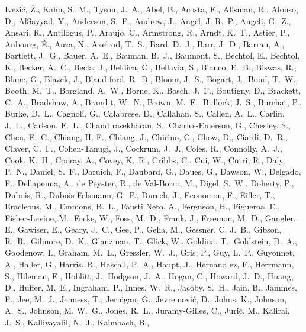 \documentclass[]{spie}
\begin{document}
\begin{thebibliography}{10}
  {Ivezi{\'c}}, {\v{Z}}., {Kahn}, S.~M., {Tyson}, J.~A., {Abel}, B., {Acosta},
    E., {Allsman}, R., {Alonso}, D., {AlSayyad}, Y., {Anderson}, S.~F., {Andrew},
    J., {Angel}, J. R.~P., {Angeli}, G.~Z., {Ansari}, R., {Antilogus}, P.,
    {Araujo}, C., {Armstrong}, R., {Arndt}, K.~T., {Astier}, P., {Aubourg},
    {\'E}., {Auza}, N., {Axelrod}, T.~S., {Bard}, D.~J., {Barr}, J.~D., {Barrau},
    A., {Bartlett}, J.~G., {Bauer}, A.~E., {Bauman}, B.~J., {Baumont}, S.,
    {Bechtol}, E., {Bechtol}, K., {Becker}, A.~C., {Becla}, J., {Beldica}, C.,
    {Bellavia}, S., {Bianco}, F.~B., {Biswas}, R., {Blanc}, G., {Blazek}, J.,
    {Bland ford}, R.~D., {Bloom}, J.~S., {Bogart}, J., {Bond}, T.~W., {Booth},
    M.~T., {Borgland}, A.~W., {Borne}, K., {Bosch}, J.~F., {Boutigny}, D.,
    {Brackett}, C.~A., {Bradshaw}, A., {Brand t}, W.~N., {Brown}, M.~E.,
    {Bullock}, J.~S., {Burchat}, P., {Burke}, D.~L., {Cagnoli}, G., {Calabrese},
    D., {Callahan}, S., {Callen}, A.~L., {Carlin}, J.~L., {Carlson}, E.~L.,
    {Chand rasekharan}, S., {Charles-Emerson}, G., {Chesley}, S., {Cheu}, E.~C.,
    {Chiang}, H.-F., {Chiang}, J., {Chirino}, C., {Chow}, D., {Ciardi}, D.~R.,
    {Claver}, C.~F., {Cohen-Tanugi}, J., {Cockrum}, J.~J., {Coles}, R.,
    {Connolly}, A.~J., {Cook}, K.~H., {Cooray}, A., {Covey}, K.~R., {Cribbs}, C.,
    {Cui}, W., {Cutri}, R., {Daly}, P.~N., {Daniel}, S.~F., {Daruich}, F.,
    {Daubard}, G., {Daues}, G., {Dawson}, W., {Delgado}, F., {Dellapenna}, A.,
    {de Peyster}, R., {de Val-Borro}, M., {Digel}, S.~W., {Doherty}, P.,
    {Dubois}, R., {Dubois-Felsmann}, G.~P., {Durech}, J., {Economou}, F.,
    {Eifler}, T., {Eracleous}, M., {Emmons}, B.~L., {Fausti Neto}, A.,
    {Ferguson}, H., {Figueroa}, E., {Fisher-Levine}, M., {Focke}, W., {Foss},
    M.~D., {Frank}, J., {Freemon}, M.~D., {Gangler}, E., {Gawiser}, E., {Geary},
    J.~C., {Gee}, P., {Geha}, M., {Gessner}, C. J.~B., {Gibson}, R.~R.,
    {Gilmore}, D.~K., {Glanzman}, T., {Glick}, W., {Goldina}, T., {Goldstein},
    D.~A., {Goodenow}, I., {Graham}, M.~L., {Gressler}, W.~J., {Gris}, P., {Guy},
    L.~P., {Guyonnet}, A., {Haller}, G., {Harris}, R., {Hascall}, P.~A., {Haupt},
    J., {Hernand ez}, F., {Herrmann}, S., {Hileman}, E., {Hoblitt}, J.,
    {Hodgson}, J.~A., {Hogan}, C., {Howard}, J.~D., {Huang}, D., {Huffer}, M.~E.,
    {Ingraham}, P., {Innes}, W.~R., {Jacoby}, S.~H., {Jain}, B., {Jammes}, F.,
    {Jee}, M.~J., {Jenness}, T., {Jernigan}, G., {Jevremovi{\'c}}, D., {Johns},
    K., {Johnson}, A.~S., {Johnson}, M. W.~G., {Jones}, R.~L., {Juramy-Gilles},
    C., {Juri{\'c}}, M., {Kalirai}, J.~S., {Kallivayalil}, N.~J., {Kalmbach}, B.,

\end{thebibliography}
\end{document}
